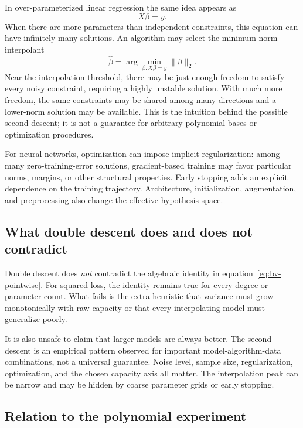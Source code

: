 \documentclass[11pt,a4paper]{article}
\begin{document}
In over-parameterized linear regression the same idea appears as
\begin{equation}
  X\beta=y.
\end{equation}
When there are more parameters than independent constraints, this equation can have infinitely many solutions. An algorithm may select the minimum-norm interpolant
\begin{equation}
  \widehat\beta
  =\arg\min_{\beta:X\beta=y}\|\beta\|_2.
\end{equation}
Near the interpolation threshold, there may be just enough freedom to satisfy every noisy constraint, requiring a highly unstable solution. With much more freedom, the same constraints may be shared among many directions and a lower-norm solution may be available. This is the intuition behind the possible second descent; it is not a guarantee for arbitrary polynomial bases or optimization procedures.

For neural networks, optimization can impose implicit regularization: among many zero-training-error solutions, gradient-based training may favor particular norms, margins, or other structural properties. Early stopping adds an explicit dependence on the training trajectory. Architecture, initialization, augmentation, and preprocessing also change the effective hypothesis space.

\subsection{What double descent does and does not contradict}

Double descent does \emph{not} contradict the algebraic identity in equation~\eqref{eq:bv-pointwise}. For squared loss, the identity remains true for every degree or parameter count. What fails is the extra heuristic that variance must grow monotonically with raw capacity or that every interpolating model must generalize poorly.

It is also unsafe to claim that larger models are always better. The second descent is an empirical pattern observed for important model-algorithm-data combinations, not a universal guarantee. Noise level, sample size, regularization, optimization, and the chosen capacity axis all matter. The interpolation peak can be narrow and may be hidden by coarse parameter grids or early stopping.

\subsection{Relation to the polynomial experiment}
\end{document}
